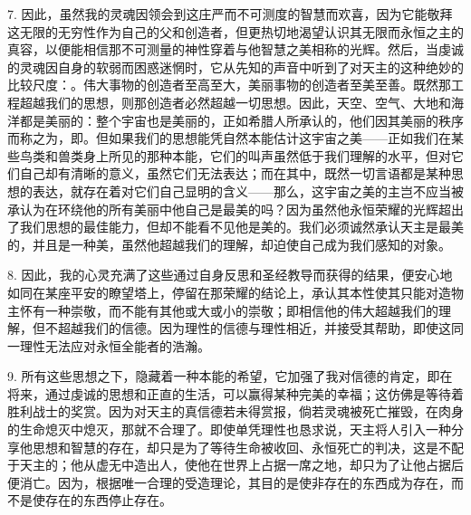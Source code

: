 7. 因此，虽然我的灵魂因领会到这庄严而不可测度的智慧而欢喜，因为它能敬拜这无限的无穷性作为自己的父和创造者，但更热切地渴望认识其无限而永恒之主的真容，以便能相信那不可测量的神性穿着与他智慧之美相称的光辉。然后，当虔诚的灵魂因自身的软弱而困惑迷惘时，它从先知的声音中听到了对天主的这种绝妙的比较尺度：。伟大事物的创造者至高至大，美丽事物的创造者至美至善。既然那工程超越我们的思想，则那创造者必然超越一切思想。因此，天空、空气、大地和海洋都是美丽的：整个宇宙也是美丽的，正如希腊人所承认的，他们因其美丽的秩序而称之为，即。但如果我们的思想能凭自然本能估计这宇宙之美——正如我们在某些鸟类和兽类身上所见的那种本能，它们的叫声虽然低于我们理解的水平，但对它们自己却有清晰的意义，虽然它们无法表达；而在其中，既然一切言语都是某种思想的表达，就存在着对它们自己显明的含义——那么，这宇宙之美的主岂不应当被承认为在环绕他的所有美丽中他自己是最美的吗？因为虽然他永恒荣耀的光辉超出了我们思想的最佳能力，但却不能看不见他是美的。我们必须诚然承认天主是最美的，并且是一种美，虽然他超越我们的理解，却迫使自己成为我们感知的对象。\par

8. 因此，我的心灵充满了这些通过自身反思和圣经教导而获得的结果，便安心地如同在某座平安的瞭望塔上，停留在那荣耀的结论上，承认其本性使其只能对造物主怀有一种崇敬，而不能有其他或大或小的崇敬；即相信他的伟大超越我们的理解，但不超越我们的信德。因为理性的信德与理性相近，并接受其帮助，即使这同一理性无法应对永恒全能者的浩瀚。\par

9. 所有这些思想之下，隐藏着一种本能的希望，它加强了我对信德的肯定，即在将来，通过虔诚的思想和正直的生活，可以赢得某种完美的幸福；这仿佛是等待着胜利战士的奖赏。因为对天主的真信德若未得赏报，倘若灵魂被死亡摧毁，在肉身的生命熄灭中熄灭，那就不合理了。即使单凭理性也恳求说，天主将人引入一种分享他思想和智慧的存在，却只是为了等待生命被收回、永恒死亡的判决，这是不配于天主的；他从虚无中造出人，使他在世界上占据一席之地，却只为了让他占据后便消亡。因为，根据唯一合理的受造理论，其目的是使非存在的东西成为存在，而不是使存在的东西停止存在。\par

